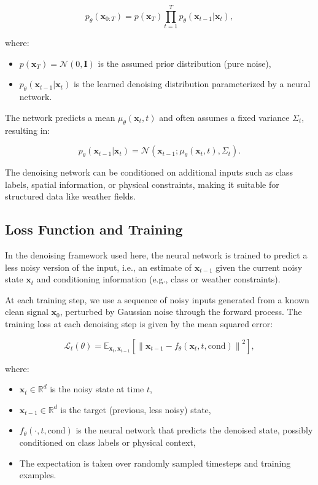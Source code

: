 $$
p_\theta(\mathbf{x}_{0:T}) = p(\mathbf{x}_T) \prod_{t=1}^T p_\theta(\mathbf{x}_{t-1} | \mathbf{x}_t),
$$

where:
\begin{itemize}
\item $p(\mathbf{x}_T) = \mathcal{N}(0, \mathbf{I})$ is the assumed prior distribution (pure noise),
\item $p_\theta(\mathbf{x}_{t-1} | \mathbf{x}_t)$ is the learned denoising distribution parameterized by a neural network.
\end{itemize}

The network predicts a mean $\mu_\theta(\mathbf{x}_t, t)$ and often assumes a fixed variance $\Sigma_t$, resulting in:

$$
p_\theta(\mathbf{x}_{t-1} | \mathbf{x}_t) = \mathcal{N}(\mathbf{x}_{t-1}; \mu_\theta(\mathbf{x}_t, t), \Sigma_t).
$$

The denoising network can be conditioned on additional inputs such as class labels, spatial information, or physical constraints, making it suitable for structured data like weather fields.

%
\subsection{Loss Function and Training}

In the denoising framework used here, the neural network is trained to predict a less noisy version of the input, i.e., an estimate of \( \mathbf{x}_{t-1} \) given the current noisy state \( \mathbf{x}_t \) and conditioning information (e.g., class or weather constraints).

At each training step, we use a sequence of noisy inputs generated from a known clean signal \( \mathbf{x}_0 \), perturbed by Gaussian noise through the forward process. The training loss at each denoising step is given by the mean squared error:

\[
\mathcal{L}_t(\theta) = \mathbb{E}_{\mathbf{x}_{t}, \mathbf{x}_{t-1}} \left[ \left\| \mathbf{x}_{t-1} - f_\theta(\mathbf{x}_t, t, \text{cond}) \right\|^2 \right],
\]

where:
\begin{itemize}
    \item \( \mathbf{x}_t \in \mathbb{R}^d \) is the noisy state at time \( t \),
    \item \( \mathbf{x}_{t-1} \in \mathbb{R}^d \) is the target (previous, less noisy) state,
    \item \( f_\theta(\cdot, t, \text{cond}) \) is the neural network that predicts the denoised state, possibly conditioned on class labels or physical context,
    \item The expectation is taken over randomly sampled timesteps and training examples.
\end{itemize}

